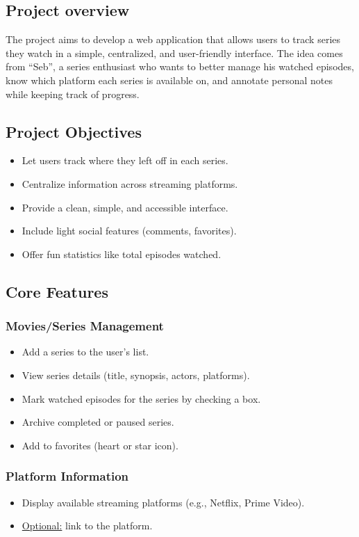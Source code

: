 \subsection{Project overview}
The project aims to develop a web application that allows users to track series they watch in a simple, centralized, and user-friendly interface. The idea comes from “Seb”, a series enthusiast who wants to better manage his watched episodes, know which platform each series is available on, and annotate personal notes while keeping track of progress.

\subsection{Project Objectives}
\begin{itemize}
    \item Let users track where they left off in each series.
    \item Centralize information across streaming platforms.
    \item Provide a clean, simple, and accessible interface.
    \item Include light social features (comments, favorites).
    \item Offer fun statistics like total episodes watched.
\end{itemize}

\subsection{Core Features}

\subsubsection{Movies/Series Management}
\begin{itemize}
    \item Add a series to the user's list.
    \item View series details (title, synopsis, actors, platforms).
    \item Mark watched episodes for the series by checking a box.
    \item Archive completed or paused series.
    \item Add to favorites (heart or star icon).
\end{itemize}

\subsubsection{Platform Information}
\begin{itemize}
    \item Display available streaming platforms (e.g., Netflix, Prime Video).
    \item \underline{Optional:} link to the platform.
\end{itemize}

